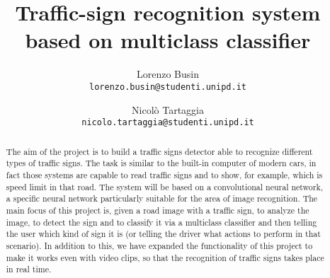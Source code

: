 \documentclass[10pt,twocolumn,letterpaper]{article}
\begin{document}
\title{Traffic-sign recognition system based on multiclass classifier}

\author{Lorenzo Busin\\
{\tt\small lorenzo.busin@studenti.unipd.it}
\and
Nicolò Tartaggia\\
{\tt\small nicolo.tartaggia@studenti.unipd.it}
}

\maketitle

\begin{abstract}
   The aim of the project is to build a traffic signs detector able to recognize different types of traffic signs. The task is similar to the built-in computer of modern cars, in fact those  systems are capable to read traffic signs and to show, for example, which is speed limit in that road.
   The system will be based on a convolutional neural network, a specific neural network particularly suitable for the area of image recognition. 
   The main focus of this project is, given a road image with a traffic sign, to analyze the image, to detect the sign and to classify it via a multiclass classifier and then telling the user which kind of sign it is (or telling the driver what actions to perform in that scenario).
   In addition to this, we have expanded the functionality of this project to make it works even with video clips, so that the recognition of traffic signs takes place in real time.
\end{abstract}

\end{document}
